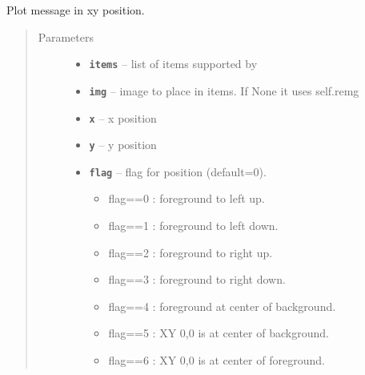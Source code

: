 \documentclass[letterpaper,10pt,english]{sphinxmanual}
\begin{document}
\begin{fulllineitems}
\begin{fulllineitems}
\begin{quote}
\begin{description}
\end{description}\end{quote}

\end{fulllineitems}


\begin{fulllineitems}
\label{RRtoolbox.lib:RRtoolbox.lib.plotter.Plotim.plotatxy}
Plot message in xy position.
\begin{quote}\begin{description}
\item[{Parameters}] \leavevmode\begin{itemize}
\item {} 
\textbf{\texttt{items}} -- list of items supported by {\hyperref[RRtoolbox.lib:RRtoolbox.lib.plotter.Plotim.makeoverlay]{\emph{}}}

\item {} 
\textbf{\texttt{img}} -- image to place in items. If None it uses self.remg

\item {} 
\textbf{\texttt{x}} -- x position

\item {} 
\textbf{\texttt{y}} -- y position

\item {} 
\textbf{\texttt{flag}} -- 
flag for position (default=0).
\begin{itemize}
\item {} 
flag==0 : foreground to left up.

\item {} 
flag==1 : foreground to left down.

\item {} 
flag==2 : foreground to right up.

\item {} 
flag==3 : foreground to right down.

\item {} 
flag==4 : foreground at center of background.

\item {} 
flag==5 : XY 0,0 is at center of background.

\item {} 
flag==6 : XY 0,0 is at center of foreground.


\end{itemize}
\end{itemize}
\end{description}
\end{quote}
\end{fulllineitems}
\end{fulllineitems}
\end{document}
